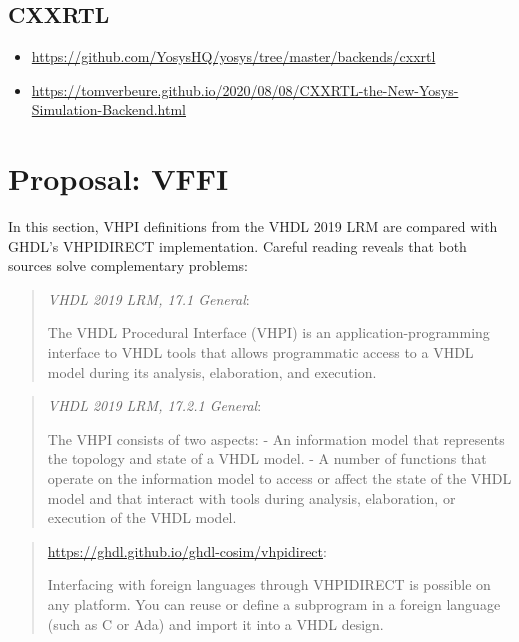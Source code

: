 \documentclass[
]{article}
\providecommand{\tightlist}{%
  \setlength{\itemsep}{0pt}\setlength{\parskip}{0pt}}
\begin{document}
\hypertarget{cxxrtl}{%
\subsection{CXXRTL}\label{cxxrtl}}

\begin{itemize}
\tightlist
\item
  \url{https://github.com/YosysHQ/yosys/tree/master/backends/cxxrtl}
\item
  \url{https://tomverbeure.github.io/2020/08/08/CXXRTL-the-New-Yosys-Simulation-Backend.html}
\end{itemize}

\hypertarget{proposal-vffi}{%
\section{Proposal: VFFI}\label{proposal-vffi}}

In this section, VHPI definitions from the VHDL 2019 LRM are compared with GHDL's VHPIDIRECT implementation. Careful reading reveals that both sources solve complementary problems:

\begin{quote}
\emph{VHDL 2019 LRM, 17.1 General}:

The VHDL Procedural Interface (VHPI) is an application-programming interface to VHDL tools that allows programmatic access to a VHDL model during its analysis, elaboration, and execution.
\end{quote}

\begin{quote}
\emph{VHDL 2019 LRM, 17.2.1 General}:

The VHPI consists of two aspects:
- An information model that represents the topology and state of a VHDL model.
- A number of functions that operate on the information model to access or affect the state of the VHDL model and that interact with tools during analysis, elaboration, or execution of the VHDL model.
\end{quote}

\begin{quote}
\url{https://ghdl.github.io/ghdl-cosim/vhpidirect}:

Interfacing with foreign languages through VHPIDIRECT is possible on any platform. You can reuse or define a subprogram in a foreign language (such as C or Ada) and import it into a VHDL design.
\end{quote}
\end{document}
